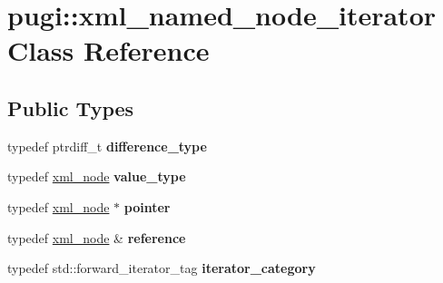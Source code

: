 \hypertarget{classpugi_1_1xml__named__node__iterator}{\section{pugi\-:\-:xml\-\_\-named\-\_\-node\-\_\-iterator Class Reference}
\label{classpugi_1_1xml__named__node__iterator}
}
\subsection*{Public Types}
\begin{DoxyCompactItemize}
\item 
\hypertarget{classpugi_1_1xml__named__node__iterator_a18fa0d610fea4d64271729abc0e28849}{typedef ptrdiff\-\_\-t {\bfseries difference\-\_\-type}}\label{classpugi_1_1xml__named__node__iterator_a18fa0d610fea4d64271729abc0e28849}

\item 
\hypertarget{classpugi_1_1xml__named__node__iterator_a8d98d8218ea9740ceb990ef2c1a456e2}{typedef \hyperlink{classpugi_1_1xml__node}{xml\-\_\-node} {\bfseries value\-\_\-type}}\label{classpugi_1_1xml__named__node__iterator_a8d98d8218ea9740ceb990ef2c1a456e2}

\item 
\hypertarget{classpugi_1_1xml__named__node__iterator_aebf72c68ded20cf483a10c6b94aa3f57}{typedef \hyperlink{classpugi_1_1xml__node}{xml\-\_\-node} $\ast$ {\bfseries pointer}}\label{classpugi_1_1xml__named__node__iterator_aebf72c68ded20cf483a10c6b94aa3f57}

\item 
\hypertarget{classpugi_1_1xml__named__node__iterator_a1c338c7a2aefe04b83f746a963df808b}{typedef \hyperlink{classpugi_1_1xml__node}{xml\-\_\-node} \& {\bfseries reference}}\label{classpugi_1_1xml__named__node__iterator_a1c338c7a2aefe04b83f746a963df808b}

\item 
\hypertarget{classpugi_1_1xml__named__node__iterator_a8d3aa9d72f7b79c82f40933b3b0db9cd}{typedef std\-::forward\-\_\-iterator\-\_\-tag {\bfseries iterator\-\_\-category}}\label{classpugi_1_1xml__named__node__iterator_a8d3aa9d72f7b79c82f40933b3b0db9cd}

\end{DoxyCompactItemize}
